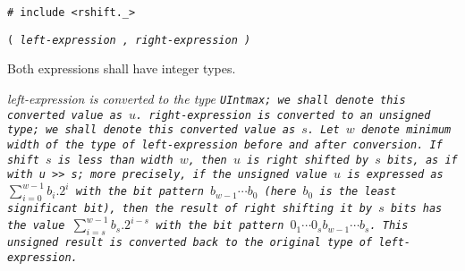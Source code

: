 
\tt{# include <rshift._>}

 \tt{(} \it{left-expression} \tt{,} \it{right-expression} \tt{)}


Both expressions shall have integer types.


\it{left-expression} is converted to the type \tt{UIntmax};
we shall denote this converted value as $u$.
\it{right-expression} is converted to an unsigned type;
we shall denote this converted value as $s$.
Let $w$ denote minimum width of the type of
\it{left-expression} before and after conversion.
If shift $s$ is less than width $w$, then $u$ is right shifted by $s$ bits,
as if with \tt{u >> s}; more precisely, if the unsigned value $u$ is expressed
as $\sum_{i = 0}^{w - 1} b_i.2^i$ with the bit pattern $b_{w - 1} \cdots b_0$
(here $b_0$ is the least significant bit), then the result of right shifting
it by $s$ bits has the value $\sum_{i = s}^{w - 1} b_s.2^{i - s}$
with the bit pattern $0_1 \cdots 0_s b_{w - 1} \cdots b_s$.
This unsigned result is converted back to
the original type of \it{left-expression}.
